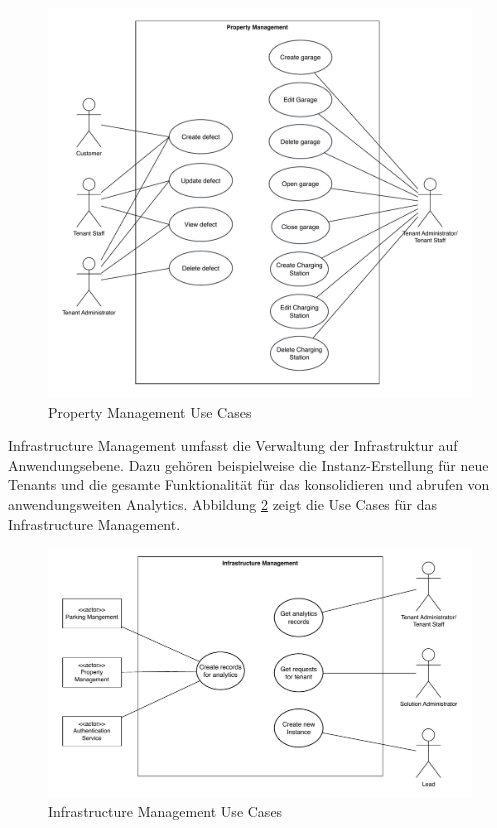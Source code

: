 \begin{figure}[H]
    \centering
    \includegraphics[width=\textwidth]{resources/prop-ma-use-cases.pdf}
    \caption{Property Management Use Cases}
    \label{fig:prop-ma-use-cases}
\end{figure}

Infrastructure Management umfasst die Verwaltung der Infrastruktur auf Anwendungsebene. Dazu gehören beispielweise die Instanz-Erstellung für neue Tenants und die gesamte Funktionalität für das konsolidieren und abrufen von anwendungsweiten Analytics. Abbildung \ref{fig:inf-ma-use-cases} zeigt die Use Cases für das Infrastructure Management.

\begin{figure}[H]
    \centering
    \includegraphics[width=\textwidth]{resources/inf-ma-use-cases.pdf}
    \caption{Infrastructure Management Use Cases}
    \label{fig:inf-ma-use-cases}
\end{figure}

